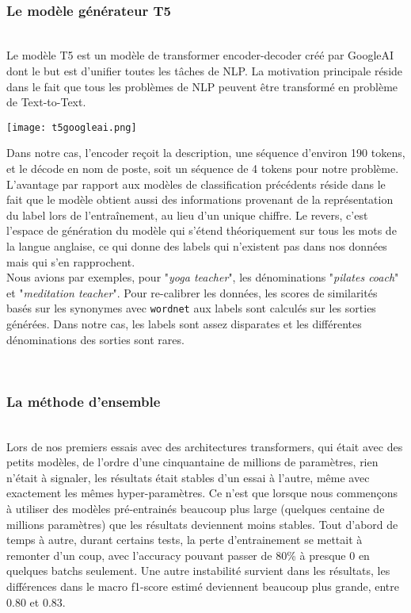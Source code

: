 \hfill\\
\subsubsection{Le modèle générateur T5}
\hfill\\
Le modèle T5 est un modèle de transformer encoder-decoder créé par GoogleAI dont le but est d'unifier toutes les tâches de NLP. La motivation principale réside dans le fait que tous les problèmes de NLP peuvent être transformé en problème de Text-to-Text.

\texttt{[image: t5googleai.png]}

Dans notre cas, l'encoder reçoit la description, une séquence d'environ 190 tokens, et le décode en nom de poste, soit un séquence de 4 tokens pour notre problème. L'avantage par rapport aux modèles de classification précédents réside dans le fait que le modèle obtient aussi des informations provenant de la représentation du label lors de l'entraînement, au lieu d'un unique chiffre.
Le revers, c'est l'espace de génération du modèle qui s'étend théoriquement sur tous les mots de la langue anglaise, ce qui donne des labels qui n'existent pas dans nos données mais qui s'en rapprochent.\\
Nous avions par exemples, pour "\textit{yoga teacher}", les dénominations "\textit{pilates coach}" et "\textit{meditation teacher}". Pour re-calibrer les données, les scores de similarités basés sur les synonymes avec \texttt{wordnet} aux labels sont calculés sur les sorties générées. Dans notre cas, les labels sont assez disparates et les différentes dénominations des sorties sont rares.

\hfill\\
\subsubsection{La méthode d'ensemble}
\hfill\\

Lors de nos premiers essais avec des architectures transformers, qui était avec des petits modèles, de l'ordre d'une cinquantaine de millions de paramètres, rien n'était à signaler, les résultats était stables d'un essai à l'autre, même avec exactement les mêmes hyper-paramètres. Ce n'est que lorsque nous commençons à utiliser des modèles pré-entrainés beaucoup plus large (quelques centaine de millions paramètres) que les résultats deviennent moins stables. Tout d'abord de temps à autre, durant certains tests, la perte d'entrainement se mettait à remonter d'un coup, avec l'accuracy pouvant passer de 80\% à presque 0 en quelques batchs seulement. Une autre instabilité survient dans les résultats, les différences dans le macro f1-score estimé deviennent beaucoup plus grande, entre 0.80 et 0.83. \\

